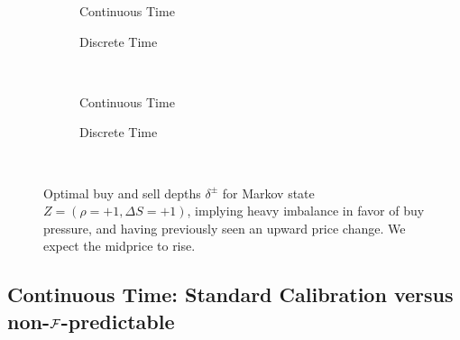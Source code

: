 \begin{figure}
\centering
\begin{subfigure}{.35\linewidth}
  \centering
  \setlength\figureheight{\linewidth} 
  \setlength\figurewidth{\linewidth}
  
  \caption{Continuous Time}
\end{subfigure}%
\hfil%
\begin{subfigure}{.35\linewidth}
  \centering
  \setlength\figureheight{\linewidth}
  \setlength\figurewidth{\linewidth}
   
  \caption{Discrete Time}
\end{subfigure}\\
\vspace{1cm}
\begin{subfigure}{.35\linewidth}
  \centering
  \setlength\figureheight{\linewidth} 
  \setlength\figurewidth{\linewidth}
  
  \caption{Continuous Time}
\end{subfigure}%
\hfil%
\begin{subfigure}{.35\linewidth}
  \centering
  \setlength\figureheight{\linewidth}
  \setlength\figurewidth{\linewidth}
   
  \caption{Discrete Time}
\end{subfigure}\\
\vspace{1cm}
\begin{subfigure}{\linewidth}
  \centering
   
\end{subfigure}%
  \caption{Optimal buy and sell depths $\delta^{\pm}$ for Markov state $Z=(\rho = +1, \Delta S = +1)$, implying heavy imbalance in favor of buy pressure, and having previously seen an upward price change. We expect the midprice to rise.}
  \label{fig:comp_dm_z15}
\end{figure}

\FloatBarrier
\subsection{Continuous Time: Standard Calibration versus \texorpdfstring{non-$\mathcal{F}$-predictable}{non-F-predictable}}


